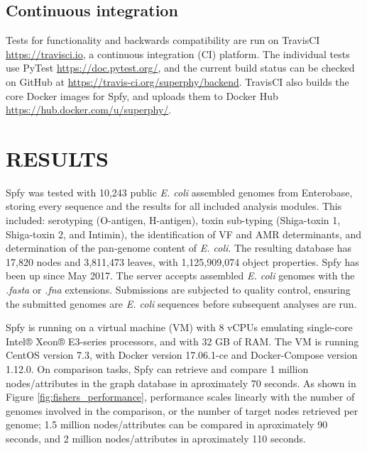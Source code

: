 \documentclass{article}
\begin{document}
\subsection{Continuous integration}


Tests for functionality and backwards compatibility are run on TravisCI \url{https://travisci.io}, a continuous integration (CI) platform.
The individual tests use PyTest \url{https://doc.pytest.org/}, and the current build status can be checked on GitHub at \url{https://travis-ci.org/superphy/backend}.
TravisCI also builds the core Docker images for Spfy, and uploads them to Docker Hub \url{https://hub.docker.com/u/superphy/}.

\section{RESULTS}
Spfy was tested with 10,243 public \textit{E. coli} assembled genomes from Enterobase, storing every sequence and the results for all included analysis modules. This included: serotyping (O-antigen, H-antigen), toxin sub-typing (Shiga-toxin 1, Shiga-toxin 2, and Intimin), the identification of VF and AMR determinants, and determination of the pan-genome content of \textit{E. coli}.
The resulting database has 17,820 nodes and 3,811,473 leaves, with 1,125,909,074 object properties.
Spfy has been up since May 2017. The server accepts assembled \textit{E. coli} genomes with the \textit{.fasta} or \textit{.fna} extensions. Submissions are subjected to quality control, ensuring the submitted genomes are \textit{E. coli} sequences before subsequent analyses are run.
\par


Spfy is running on a virtual machine (VM) with 8 vCPUs emulating single-core Intel® Xeon® E3-series processors, and with 32 GB of RAM.
The VM is running CentOS version 7.3, with Docker version 17.06.1-ce and Docker-Compose version 1.12.0.
On comparison tasks, Spfy can retrieve and compare 1 million nodes/attributes in the graph database in aproximately 70 seconds.
As shown in Figure \ref{fig:fishers_performance}, performance scales linearly with the number of genomes involved in the comparison, or the number of target nodes retrieved per genome; 1.5 million nodes/attributes can be compared in aproximately 90 seconds, and 2 million nodes/attributes in aproximately 110 seconds.
\end{document}
